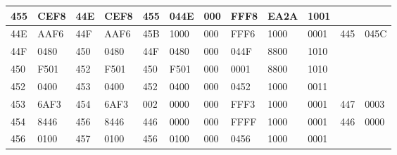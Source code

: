 \begin{table}[!ht]
{\begin{tabular}{|l|l|l|l|l|l|l|l|l|l|l|l|}
        455 & CEF8 & 44E & CEF8 & 455 & 044E & 000 & FFF8 & EA2A & 1001 & ~ & ~ \\ \hline
        44E & AAF6 & 44F & AAF6 & 45B & 1000 & 000 & FFF6 & 1000 & 0001 & 445 & 045C \\ \hline
        44F & 0480 & 450 & 0480 & 44F & 0480 & 000 & 044F & 8800 & 1010 & ~ & ~ \\ \hline
        450 & F501 & 452 & F501 & 450 & F501 & 000 & 0001 & 8800 & 1010 & ~ & ~ \\ \hline
        452 & 0400 & 453 & 0400 & 452 & 0400 & 000 & 0452 & 1000 & 0011 & ~ & ~ \\ \hline
        453 & 6AF3 & 454 & 6AF3 & 002 & 0000 & 000 & FFF3 & 1000 & 0001 & 447 & 0003 \\ \hline
        454 & 8446 & 456 & 8446 & 446 & 0000 & 000 & FFFF & 1000 & 0001 & 446 & 0000 \\ \hline
        456 & 0100 & 457 & 0100 & 456 & 0100 & 000 & 0456 & 1000 & 0001 & ~ & ~ \\ \hline
    \end{tabular}}
\end{table}
